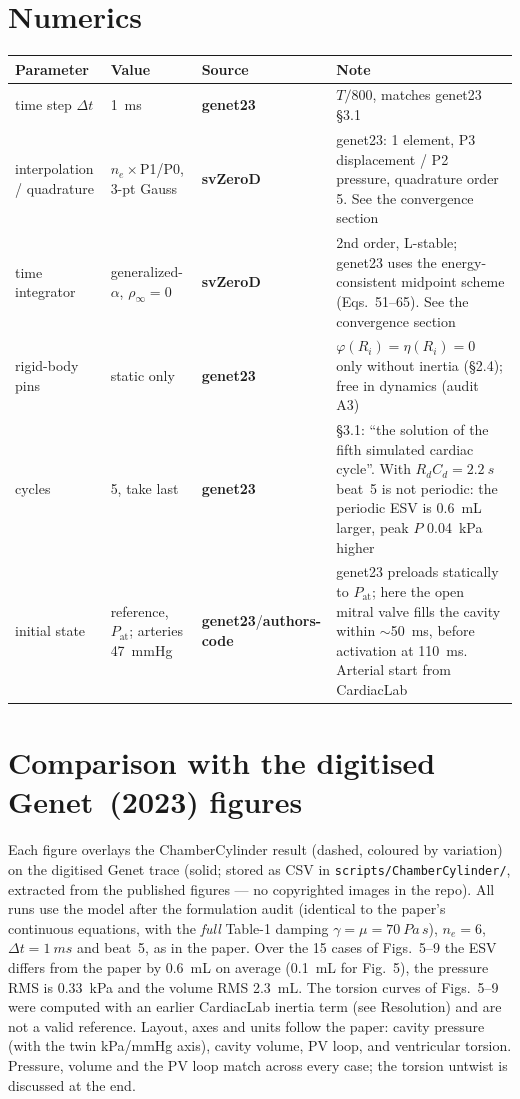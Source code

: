 \documentclass[10pt]{article}
\newcommand{\gen}{\textcolor{cgen}{\textbf{genet23}}}
\newcommand{\code}{\textcolor{ccode}{\textbf{authors-code}}}
\newcommand{\svz}{\textcolor{csvz}{\textbf{svZeroD}}}
\begin{document}
\section*{Numerics}
\begin{longtable}{l l l P{6.4cm}}
\toprule Parameter & Value & Source & Note \\ \midrule\endhead
time step $\Delta t$ & \SI{1}{ms} & \gen & $T/800$, matches genet23 \S3.1 \\
interpolation / quadrature & $n_e\times$P1/P0, 3-pt Gauss & \svz & genet23: 1 element, P3 displacement / P2 pressure, quadrature order 5. See the convergence section \\
time integrator & generalized-$\alpha$, $\rho_\infty{=}0$ & \svz & 2nd order, L-stable; genet23 uses the energy-consistent midpoint scheme (Eqs.~51--65). See the convergence section \\
rigid-body pins & static only & \gen & $\varphi(R_i){=}\eta(R_i){=}0$ only without inertia (\S2.4); free in dynamics (audit A3) \\
cycles & 5, take last & \gen & \S3.1: ``the solution of the fifth simulated cardiac cycle''. With $R_dC_d=\SI{2.2}{s}$ beat~5 is not periodic: the periodic ESV is \SI{0.6}{mL} larger, peak $P$ \SI{0.04}{kPa} higher \\
initial state & reference, $P_\text{at}$; arteries \SI{47}{mmHg} & \gen/\code & genet23 preloads statically to $P_\text{at}$; here the open mitral valve fills the cavity within $\sim$\SI{50}{ms}, before activation at \SI{110}{ms}. Arterial start from CardiacLab \\
\bottomrule
\end{longtable}

\clearpage
\section*{Comparison with the digitised Genet~(2023) figures}
\noindent Each figure overlays the ChamberCylinder result (dashed, coloured by variation) on the
digitised Genet trace (solid; stored as CSV in \texttt{scripts/ChamberCylinder/}, extracted from the published
figures --- no copyrighted images in the repo). All runs use the model after the formulation
audit (identical to the paper's continuous equations, with the \emph{full} Table-1 damping
$\gamma{=}\mu{=}\SI{70}{Pa\,s}$), $n_e=6$, $\Delta t=\SI{1}{ms}$ and beat~5, as in the paper.
Over the 15 cases of Figs.~5--9 the ESV differs from the paper by \SI{0.6}{mL} on average
(\SI{0.1}{mL} for Fig.~5), the pressure RMS is \SI{0.33}{kPa} and the volume RMS \SI{2.3}{mL}.
The torsion curves of Figs.~5--9 were computed with an earlier CardiacLab inertia term (see
Resolution) and are not a valid reference.
Layout, axes and units follow the paper: cavity pressure
(with the twin kPa/mmHg axis), cavity volume, PV loop, and ventricular torsion. Pressure, volume
and the PV loop match across every case; the torsion untwist is discussed at the end.
\end{document}
